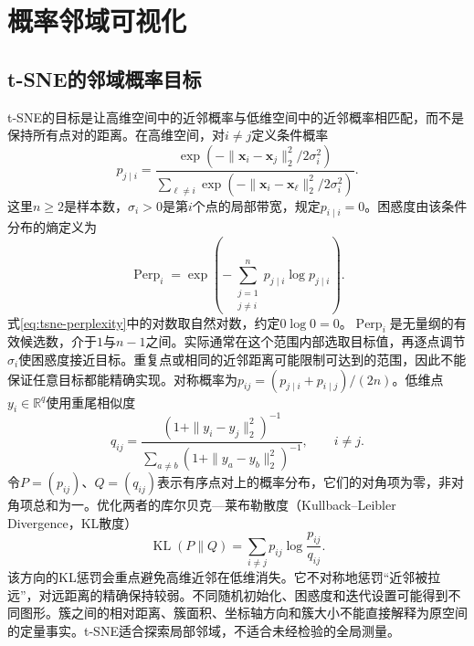 \section{概率邻域可视化}
\subsection{t-SNE的邻域概率目标}
t-SNE的目标是让高维空间中的近邻概率与低维空间中的近邻概率相匹配，而不是保持所有点对的距离\cite{vandermaaten2008tsne}。在高维空间，对$i\ne j$定义条件概率
\begin{equation}
 p_{j\mid i}=\frac{\exp(-\|\bm x_i-\bm x_j\|_2^2/2\sigma_i^2)}{\sum_{\ell\ne i}\exp(-\|\bm x_i-\bm x_\ell\|_2^2/2\sigma_i^2)}.
 \label{eq:tsne-high-prob}
\end{equation}
这里$n\geq2$是样本数，$\sigma_i>0$是第$i$个点的局部带宽，规定$p_{i\mid i}=0$。困惑度由该条件分布的熵定义为
\begin{equation}
 \operatorname{Perp}_i=
 \exp\left(-\sum_{\substack{j=1\\j\ne i}}^{n}
 p_{j\mid i}\log p_{j\mid i}\right).
 \label{eq:tsne-perplexity}
\end{equation}
式\eqref{eq:tsne-perplexity}中的对数取自然对数，约定$0\log0=0$。$\operatorname{Perp}_i$是无量纲的有效候选数，介于$1$与$n-1$之间。实际通常在这个范围内部选取目标值，再逐点调节$\sigma_i$使困惑度接近目标。重复点或相同的近邻距离可能限制可达到的范围，因此不能保证任意目标都能精确实现。对称概率为$p_{ij}=(p_{j\mid i}+p_{i\mid j})/(2n)$。低维点$y_i\in\mathbb R^q$使用重尾相似度
\begin{equation}
 q_{ij}=\frac{(1+\|y_i-y_j\|_2^2)^{-1}}{\sum_{a\ne b}(1+\|y_a-y_b\|_2^2)^{-1}},
 \qquad i\ne j .
 \label{eq:tsne-low-prob}
\end{equation}
令$P=(p_{ij})$、$Q=(q_{ij})$表示有序点对上的概率分布，它们的对角项为零，非对角项总和为一。优化两者的库尔贝克—莱布勒散度（Kullback--Leibler Divergence，KL散度）
\begin{equation}
 \operatorname{KL}(P\|Q)=\sum_{i\ne j}p_{ij}\log\frac{p_{ij}}{q_{ij}}.
 \label{eq:tsne-objective}
\end{equation}
该方向的KL惩罚会重点避免高维近邻在低维消失。它不对称地惩罚“近邻被拉远”，对远距离的精确保持较弱。不同随机初始化、困惑度和迭代设置可能得到不同图形。簇之间的相对距离、簇面积、坐标轴方向和簇大小不能直接解释为原空间的定量事实。t-SNE适合探索局部邻域，不适合未经检验的全局测量。

